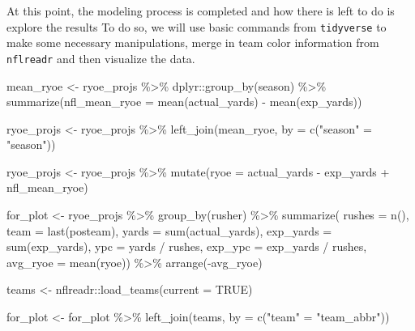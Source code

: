 \documentclass[
  letterpaper,
]{krantz}
\newenvironment{Shaded}{\begin{snugshade}}{\end{snugshade}}
\newcommand{\AttributeTok}[1]{\textcolor[rgb]{0.40,0.45,0.13}{#1}}
\newcommand{\ConstantTok}[1]{\textcolor[rgb]{0.56,0.35,0.01}{#1}}
\newcommand{\FunctionTok}[1]{\textcolor[rgb]{0.28,0.35,0.67}{#1}}
\newcommand{\NormalTok}[1]{\textcolor[rgb]{0.00,0.23,0.31}{#1}}
\newcommand{\OtherTok}[1]{\textcolor[rgb]{0.00,0.23,0.31}{#1}}
\newcommand{\SpecialCharTok}[1]{\textcolor[rgb]{0.37,0.37,0.37}{#1}}
\newcommand{\StringTok}[1]{\textcolor[rgb]{0.13,0.47,0.30}{#1}}
\begin{document}
At this point, the modeling process is completed and how there is left
to do is explore the results To do so, we will use basic commands from
\texttt{tidyverse} to make some necessary manipulations, merge in team
color information from \texttt{nflreadr} and then visualize the data.

\begin{Shaded}
\begin{Highlighting}[]
\NormalTok{mean\_ryoe }\OtherTok{\textless{}{-}}\NormalTok{ ryoe\_projs }\SpecialCharTok{\%\textgreater{}\%}
\NormalTok{  dplyr}\SpecialCharTok{::}\FunctionTok{group\_by}\NormalTok{(season) }\SpecialCharTok{\%\textgreater{}\%}
  \FunctionTok{summarize}\NormalTok{(}\AttributeTok{nfl\_mean\_ryoe =} \FunctionTok{mean}\NormalTok{(actual\_yards) }\SpecialCharTok{{-}} \FunctionTok{mean}\NormalTok{(exp\_yards))}

\NormalTok{ryoe\_projs }\OtherTok{\textless{}{-}}\NormalTok{ ryoe\_projs }\SpecialCharTok{\%\textgreater{}\%}
  \FunctionTok{left\_join}\NormalTok{(mean\_ryoe, }\AttributeTok{by =} \FunctionTok{c}\NormalTok{(}\StringTok{"season"} \OtherTok{=} \StringTok{"season"}\NormalTok{))}

\NormalTok{ryoe\_projs }\OtherTok{\textless{}{-}}\NormalTok{ ryoe\_projs }\SpecialCharTok{\%\textgreater{}\%}
  \FunctionTok{mutate}\NormalTok{(}\AttributeTok{ryoe =}\NormalTok{ actual\_yards }\SpecialCharTok{{-}}\NormalTok{ exp\_yards }\SpecialCharTok{+}\NormalTok{ nfl\_mean\_ryoe)}

\NormalTok{for\_plot }\OtherTok{\textless{}{-}}\NormalTok{ ryoe\_projs }\SpecialCharTok{\%\textgreater{}\%}
  \FunctionTok{group\_by}\NormalTok{(rusher) }\SpecialCharTok{\%\textgreater{}\%}
  \FunctionTok{summarize}\NormalTok{(}
    \AttributeTok{rushes =} \FunctionTok{n}\NormalTok{(),}
    \AttributeTok{team =} \FunctionTok{last}\NormalTok{(posteam),}
    \AttributeTok{yards =} \FunctionTok{sum}\NormalTok{(actual\_yards),}
    \AttributeTok{exp\_yards =} \FunctionTok{sum}\NormalTok{(exp\_yards),}
    \AttributeTok{ypc =}\NormalTok{ yards }\SpecialCharTok{/}\NormalTok{ rushes,}
    \AttributeTok{exp\_ypc =}\NormalTok{ exp\_yards }\SpecialCharTok{/}\NormalTok{ rushes,}
    \AttributeTok{avg\_ryoe =} \FunctionTok{mean}\NormalTok{(ryoe)) }\SpecialCharTok{\%\textgreater{}\%}
  \FunctionTok{arrange}\NormalTok{(}\SpecialCharTok{{-}}\NormalTok{avg\_ryoe)}

\NormalTok{teams }\OtherTok{\textless{}{-}}\NormalTok{ nflreadr}\SpecialCharTok{::}\FunctionTok{load\_teams}\NormalTok{(}\AttributeTok{current =} \ConstantTok{TRUE}\NormalTok{)}

\NormalTok{for\_plot }\OtherTok{\textless{}{-}}\NormalTok{ for\_plot }\SpecialCharTok{\%\textgreater{}\%}
  \FunctionTok{left\_join}\NormalTok{(teams, }\AttributeTok{by =} \FunctionTok{c}\NormalTok{(}\StringTok{"team"} \OtherTok{=} \StringTok{"team\_abbr"}\NormalTok{))}
\end{Highlighting}
\end{Shaded}
\end{document}
